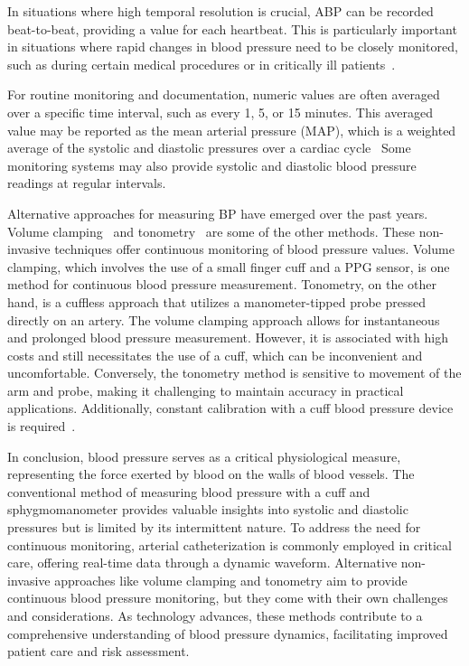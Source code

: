 In situations where high temporal resolution is crucial, ABP can be recorded beat-to-beat, providing a value for each heartbeat.
This is particularly important in situations where rapid changes in blood pressure need to be closely monitored, such as during certain medical procedures or in critically ill patients~\cite{lehmanMethodsBloodPressure2013}.

For routine monitoring and documentation, numeric values are often averaged over a specific time interval, such as every 1, 5, or 15 minutes.
This averaged value may be reported as the mean arterial pressure (MAP), which is a weighted average of the systolic and diastolic pressures over a cardiac cycle~\cite{demersPhysiologyMeanArterial2024}
Some monitoring systems may also provide systolic and diastolic blood pressure readings at regular intervals.

Alternative approaches for measuring BP have emerged over the past years.
Volume clamping~\cite{kimBallistocardiogramBasedApproachCuffless2018} and tonometry~\cite{imholzFifteenYearsExperience1998} are some of the other methods.
These non-invasive techniques offer continuous monitoring of blood pressure values.
Volume clamping, which involves the use of a small finger cuff and a PPG sensor, is one method for continuous blood pressure measurement.
Tonometry, on the other hand, is a cuffless approach that utilizes a manometer-tipped probe pressed directly on an artery.
The volume clamping approach allows for instantaneous and prolonged blood pressure measurement.
However, it is associated with high costs and still necessitates the use of a cuff, which can be inconvenient and uncomfortable.
Conversely, the tonometry method is sensitive to movement of the arm and probe, making it challenging to maintain accuracy in practical applications.
Additionally, constant calibration with a cuff blood pressure device is required~\cite{peterReviewMethodsNoninvasive2014}.

\vspace{0.2cm}

In conclusion, blood pressure serves as a critical physiological measure, representing the force exerted by blood on the walls of blood vessels.
The conventional method of measuring blood pressure with a cuff and sphygmomanometer provides valuable insights into systolic and diastolic pressures but is limited by its intermittent nature.
To address the need for continuous monitoring, arterial catheterization is commonly employed in critical care, offering real-time data through a dynamic waveform.
Alternative non-invasive approaches like volume clamping and tonometry aim to provide continuous blood pressure monitoring, but they come with their own challenges and considerations.
As technology advances, these methods contribute to a comprehensive understanding of blood pressure dynamics, facilitating improved patient care and risk assessment.

